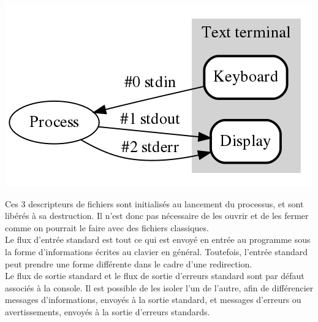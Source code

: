 			\begin{center}\includegraphics[scale=0.4]{../img/stdStreams.png}\end{center}
			
			Ces 3 descripteurs de fichiers sont initialisés au lancement du processus, et sont libérés à sa destruction. Il n'est donc pas nécessaire de les ouvrir et de les fermer comme on pourrait le faire avec des fichiers classiques.\\
			Le flux d'entrée standard est tout ce qui est envoyé en entrée au programme sous la forme d'informations écrites au clavier en général. Toutefois, l'entrée standard peut prendre une forme différente dans le cadre d'une redirection.\\
			Le flux de sortie standard et le flux de sortie d'erreurs standard sont par défaut associés à la console. Il est possible de les isoler l'un de l'autre, afin de différencier messages d'informations, envoyés à la sortie standard, et messages d'erreurs ou avertissements, envoyés à la sortie d'erreurs standards.
			

